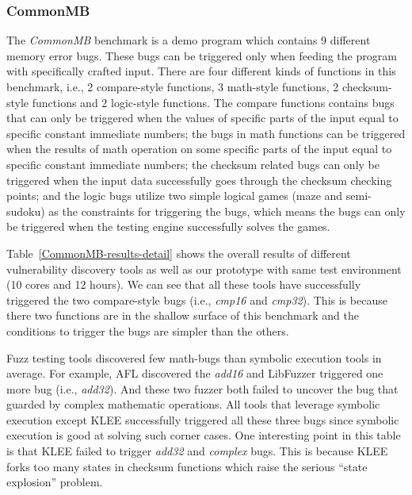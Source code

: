 \subsubsection{CommonMB}
\noindent The \emph{CommonMB} benchmark is a demo program which contains 9 different memory error bugs. These bugs can be triggered only when feeding the program with specifically crafted input. There are four different kinds of functions in this benchmark, i.e., 2 compare-style functions, 3 math-style functions, 2 checksum-style functions and 2 logic-style functions. The compare functions contains bugs that can only be triggered when the values of specific parts of the input equal to specific constant immediate numbers; the bugs in math functions can be triggered when the results of math operation on some specific parts of the input equal to specific constant immediate numbers; the checksum related bugs can only be triggered when the input data successfully goes through the checksum checking points; and the logic bugs utilize two simple logical games (maze and semi-sudoku) as the constraints for triggering the bugs, which means the bugs can only be triggered when the testing engine successfully solves the games.

Table~\ref{CommonMB-results-detail} shows the overall results of different vulnerability discovery tools as well as our prototype with same test environment (10 cores and 12 hours).
We can see that all these tools have successfully triggered the two compare-style bugs (i.e., \textit{cmp16} and \textit{cmp32}). This is because there two functions are in the shallow surface of this benchmark and the conditions to trigger the bugs are simpler than the others.  

Fuzz testing tools discovered few math-bugs than symbolic execution tools in average.
 For example, AFL discovered the \textit{add16} and LibFuzzer triggered one more bug (i.e., \textit{add32}). 
 And these two fuzzer both failed to uncover the bug that guarded by complex mathematic operations. 
 All tools that leverage symbolic execution except KLEE successfully triggered all these three bugs since symbolic execution is good at solving such corner cases. 
 One interesting point in this table is that KLEE failed to trigger \textit{add32} and \textit{complex} bugs. 
 This is because KLEE forks too many states in checksum functions which raise the serious ``state explosion'' problem. 

